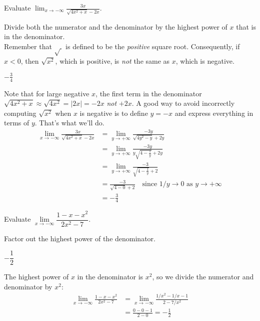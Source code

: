 \begin{question}[2015Q]\label{s1.5first_neg_sqrt}
 Evaluate $\displaystyle \lim_{x\to -\infty} \frac{3x}{\sqrt{4x^2+x}-2x}$.
\end{question}
\begin{hint}
Divide both the numerator and the denominator by the highest
         power of $x$ that is in the denominator.\\
Remember that $\sqrt{\ }$ is defined to be the \emph{positive} square root.
          Consequently, if $x<0$, then $\sqrt{x^2}$, which
          is positive, is \emph{not} the same as $x$, which is negative.\end{hint}
\begin{answer}
$-\frac{3}{4}$
\end{answer}
\begin{solution}
Note that for large negative $x$, the first term in the denominator 
$\sqrt{4x^2+x}\approx\sqrt{4x^2}=|2x|=-2x$ \emph{not} $+2x$. A good way to
avoid incorrectly computing $\sqrt{x^2}$ when $x$ is negative is to define
$y=-x$ and express everything in terms of $y$. That's what we'll do.
\begin{align*}
\lim_{x\to -\infty} \frac{3x}{\sqrt{4x^2+x}-2x}
&=\lim_{y\to +\infty} \frac{-3y}{\sqrt{4y^2-y}+2y} \\
&=\lim_{y\to +\infty} \frac{-3y}{y\sqrt{4-\frac{1}{y}}+2y} \\
&=\lim_{y\to +\infty} \frac{-3}{\sqrt{4-\frac{1}{y}}+2} \\
&=\frac{-3}{\sqrt{4-0}+2} \quad\text{since $1/y\to 0$ as $y\to +\infty$}
\\
&= -\frac{3}{4}
\end{align*}  
\end{solution}%


\begin{Mquestion}[2007H]
Evaluate $\lim\limits_{x\rightarrow -\infty}\dfrac{1-x-x^2}{2x^2-7}$.
\end{Mquestion}
\begin{hint}
Factor out the highest power of the denominator.
\end{hint}
\begin{answer}
$-\dfrac{1}{2}$
\end{answer}
\begin{solution}
The highest power of $x$ in the denominator is $x^2$, so we divide the numerator and denominator by $x^2$:
\begin{align*}
\lim\limits_{x\rightarrow -\infty}\frac{1-x-x^2}{2x^2-7}&=
\lim\limits_{x\rightarrow -\infty}\frac{1/x^2-1/x-1}{2-7/x^2}\\
&=\frac{0-0-1}{2-0}=-\frac{1}{2}
\end{align*}
\end{solution}







